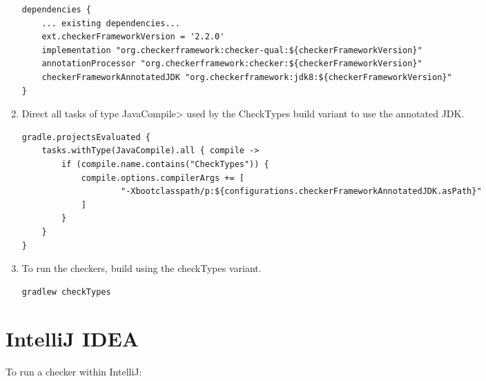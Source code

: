 \begin{enumerate}
\begin{mysmall}
\begin{Verbatim}
dependencies {
    ... existing dependencies...
    ext.checkerFrameworkVersion = '2.2.0'
    implementation "org.checkerframework:checker-qual:${checkerFrameworkVersion}"
    annotationProcessor "org.checkerframework:checker:${checkerFrameworkVersion}"
    checkerFrameworkAnnotatedJDK "org.checkerframework:jdk8:${checkerFrameworkVersion}"
}
\end{Verbatim}
\end{mysmall}

\item Direct all tasks of type \<JavaCompile> used by the CheckTypes build variant to use the annotated JDK.
\begin{mysmall}
\begin{Verbatim}
gradle.projectsEvaluated {
    tasks.withType(JavaCompile).all { compile ->
        if (compile.name.contains("CheckTypes")) {
            compile.options.compilerArgs += [
                    "-Xbootclasspath/p:${configurations.checkerFrameworkAnnotatedJDK.asPath}"
            ]
        }
    }
}
\end{Verbatim}
\end{mysmall}

\item To run the checkers, build using the checkTypes variant.
\begin{Verbatim}
gradlew checkTypes
\end{Verbatim}

\end{enumerate}

\section{IntelliJ IDEA\label{intellij}}


To run a checker within IntelliJ:

